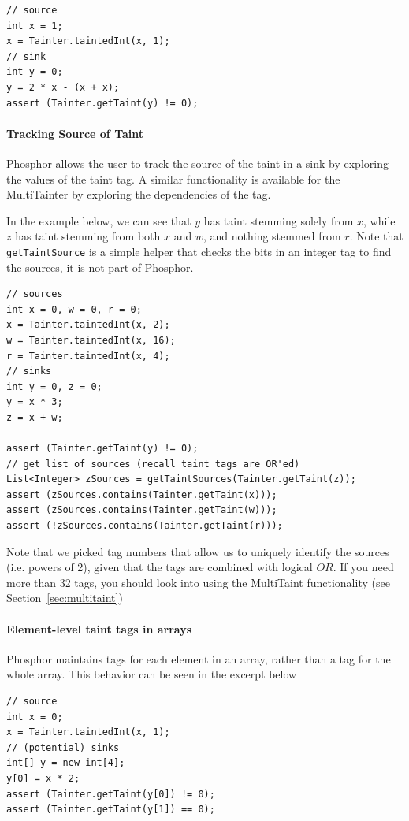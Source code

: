 \documentclass[a4paper]{article}
\begin{document}
\begin{lstlisting}
// source
int x = 1;
x = Tainter.taintedInt(x, 1);
// sink
int y = 0;
y = 2 * x - (x + x);
assert (Tainter.getTaint(y) != 0);
\end{lstlisting}

\paragraph{Tracking Source of Taint}
Phosphor allows the user to track the source of the taint in a sink by exploring the values
of the taint tag. A similar functionality is available for the MultiTainter by exploring
the dependencies of the tag.

In the example below, we can see that $y$ has taint stemming solely from $x$, while $z$ has
taint stemming from both $x$ and $w$, and nothing stemmed from $r$. Note that
\verb|getTaintSource| is a simple helper that checks the bits in an integer tag to find the sources,
it is not part of Phosphor.

\begin{lstlisting}
// sources
int x = 0, w = 0, r = 0;
x = Tainter.taintedInt(x, 2);
w = Tainter.taintedInt(x, 16);
r = Tainter.taintedInt(x, 4);
// sinks
int y = 0, z = 0;
y = x * 3;
z = x + w;

assert (Tainter.getTaint(y) != 0);
// get list of sources (recall taint tags are OR'ed)
List<Integer> zSources = getTaintSources(Tainter.getTaint(z));
assert (zSources.contains(Tainter.getTaint(x)));
assert (zSources.contains(Tainter.getTaint(w)));
assert (!zSources.contains(Tainter.getTaint(r)));
\end{lstlisting}

Note that we picked tag numbers that allow us to uniquely identify the sources (i.e. powers of 2),
given that the tags are combined with logical $OR$. If you need more than 32 tags, you should
look into using the MultiTaint functionality (see Section~\ref{sec:multitaint})


\paragraph{Element-level taint tags in arrays}
Phosphor maintains tags for each element in an array, rather than a tag for the
whole array\cite{bell2014phosphor}. This behavior can be seen in the excerpt below


\begin{lstlisting}
// source
int x = 0;
x = Tainter.taintedInt(x, 1);
// (potential) sinks
int[] y = new int[4];
y[0] = x * 2;
assert (Tainter.getTaint(y[0]) != 0);
assert (Tainter.getTaint(y[1]) == 0);
\end{lstlisting}
\end{document}
